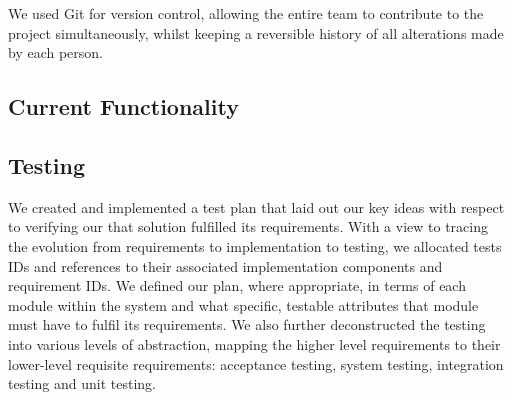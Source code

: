 \documentclass[10pt,a4paper]{article}
\begin{document}
We used Git for version control, allowing the entire team to contribute to the project simultaneously, whilst keeping a reversible history of all alterations made by each person.

\subsection{Current Functionality}

\subsection{Testing} 

We created and implemented a test plan that laid out our key ideas with respect to verifying our that solution fulfilled its requirements. With a view to tracing the evolution from requirements to implementation to testing, we allocated tests IDs and references to their associated implementation components and requirement IDs. We defined our plan, where appropriate, in terms of each module within the system and what specific, testable attributes that module must have to fulfil its requirements. We also further deconstructed the testing into various levels of abstraction, mapping the higher level requirements to their lower-level requisite requirements: acceptance testing, system testing, integration testing and unit testing. %

\end{document}
